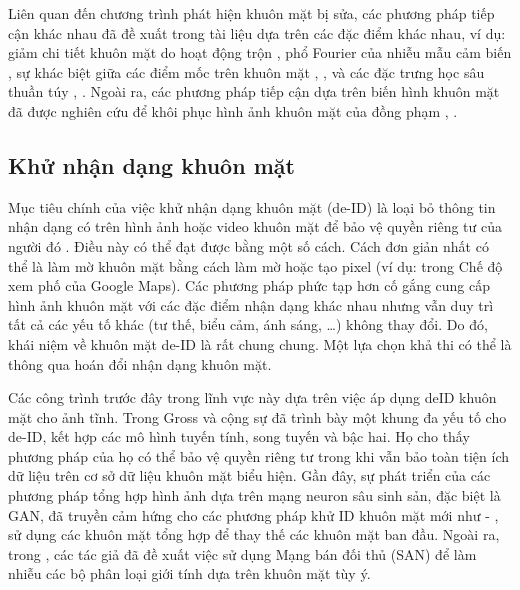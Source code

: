 \documentclass{article}
\begin{document}
Liên quan đến chương trình phát hiện khuôn mặt bị sửa, các phương pháp tiếp cận khác nhau đã đề xuất trong tài liệu dựa trên các đặc điểm khác nhau, ví dụ: giảm chi tiết khuôn mặt do hoạt động trộn , phổ Fourier của nhiễu mẫu cảm biến , sự khác biệt giữa các điểm mốc trên khuôn mặt , , và các đặc trưng học sâu thuần túy , . Ngoài ra, các phương pháp tiếp cận dựa trên biến hình khuôn mặt đã được nghiên cứu để khôi phục hình ảnh khuôn mặt của đồng phạm , .

\subsection{Khử nhận dạng khuôn mặt} \label{sec:7-b-de-id}

Mục tiêu chính của việc khử nhận dạng khuôn mặt (de-ID) là loại bỏ thông tin nhận dạng có trên hình ảnh hoặc video khuôn mặt để bảo vệ quyền riêng tư của người đó . Điều này có thể đạt được bằng một số cách. Cách đơn giản nhất có thể là làm mờ khuôn mặt bằng cách làm mờ hoặc tạo pixel (ví dụ: trong Chế độ xem phố của Google Maps). Các phương pháp phức tạp hơn cố gắng cung cấp hình ảnh khuôn mặt với các đặc điểm nhận dạng khác nhau nhưng vẫn duy trì tất cả các yếu tố khác (tư thế, biểu cảm, ánh sáng, …) không thay đổi. Do đó, khái niệm về khuôn mặt de-ID là rất chung chung. Một lựa chọn khả thi có thể là thông qua hoán đổi nhận dạng khuôn mặt.

Các công trình trước đây trong lĩnh vực này dựa trên việc áp dụng deID khuôn mặt cho ảnh tĩnh. Trong  Gross và cộng sự đã trình bày một khung đa yếu tố cho de-ID, kết hợp các mô hình tuyến tính, song tuyến và bậc hai. Họ cho thấy phương pháp của họ có thể bảo vệ quyền riêng tư trong khi vẫn bảo toàn tiện ích dữ liệu trên cơ sở dữ liệu khuôn mặt biểu hiện. Gần đây, sự phát triển của các phương pháp tổng hợp hình ảnh dựa trên mạng neuron sâu sinh sản, đặc biệt là GAN, đã truyền cảm hứng cho các phương pháp khử ID khuôn mặt mới như  - , sử dụng các khuôn mặt tổng hợp để thay thế các khuôn mặt ban đầu. Ngoài ra, trong , các tác giả đã đề xuất việc sử dụng Mạng bán đối thủ (SAN) để làm nhiễu các bộ phân loại giới tính dựa trên khuôn mặt tùy ý.
\end{document}
